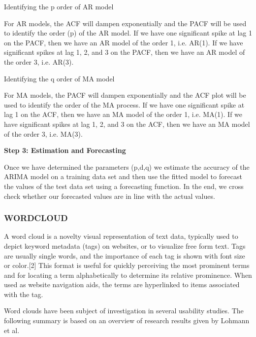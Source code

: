 \documentclass[a4paper, 12pt]{extarticle}
\begin{document}
{Identifying the p order of AR model

For AR models, the ACF will dampen exponentially and the PACF will be used to identify the order (p) of the AR model. If we have one significant spike at lag 1 on the PACF, then we have an AR model of the order 1, i.e. AR(1). If we have significant spikes at lag 1, 2, and 3 on the PACF, then we have an AR model of the order 3, i.e. AR(3).

Identifying the q order of MA model

For MA models, the PACF will dampen exponentially and the ACF plot will be used to identify the order of the MA process. If we have one significant spike at lag 1 on the ACF, then we have an MA model of the order 1, i.e. MA(1). If we have significant spikes at lag 1, 2, and 3 on the ACF, then we have an MA model of the order 3, i.e. MA(3).

\textbf{Step 3: Estimation and Forecasting}

Once we have determined the parameters (p,d,q) we estimate the accuracy of the ARIMA model on a training data set and then use the fitted model to forecast the values of the test data set using a forecasting function. In the end, we cross check whether our forecasted values are in line with the actual values.

\subsubsection{WORDCLOUD}
A word cloud is a novelty visual representation of text data, typically used to depict keyword metadata (tags) on websites, or to visualize free form text. Tags are usually single words, and the importance of each tag is shown with font size or color.[2] This format is useful for quickly perceiving the most prominent terms and for locating a term alphabetically to determine its relative prominence. When used as website navigation aids, the terms are hyperlinked to items associated with the tag.

Word clouds have been subject of investigation in several usability studies. The following summary is based on an overview of research results given by Lohmann et al.

}
\end{document}
